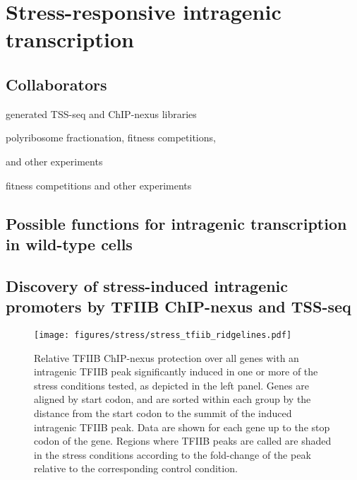 \chapter{Stress-responsive intragenic transcription}
\label{chapter:stress}

\section{Collaborators}

\begin{description}[align=right, labelwidth=5cm, noitemsep]
    \item [Steve Doris] generated TSS-seq and ChIP-nexus libraries
    \item [Dan Spatt] polyribosome fractionation, fitness competitions,
    \item [] and other experiments
    \item [James Warner] fitness competitions and other experiments
\end{description}

\section{Possible functions for intragenic transcription in wild-type cells}

\lipsum[1]

\section{Discovery of stress-induced intragenic promoters by TFIIB ChIP-nexus and TSS-seq}

\lipsum[1]

\begin{sidewaysfigure}
    \texttt{[image: figures/stress/stress\_tfiib\_ridgelines.pdf]}
    \caption[TFIIB ChIP-nexus protection over all genes with stress-induced intragenic TFIIB peaks.]{Relative TFIIB ChIP-nexus protection over all genes with an intragenic TFIIB peak significantly induced in one or more of the stress conditions tested, as depicted in the left panel. Genes are aligned by start codon, and are sorted within each group by the distance from the start codon to the summit of the induced intragenic TFIIB peak. Data are shown for each gene up to the stop codon of the gene. Regions where TFIIB peaks are called are shaded in the stress conditions according to the fold-change of the peak relative to the corresponding control condition.}
    \label{fig:stress_tfiib_ridgelines}
\end{sidewaysfigure}

